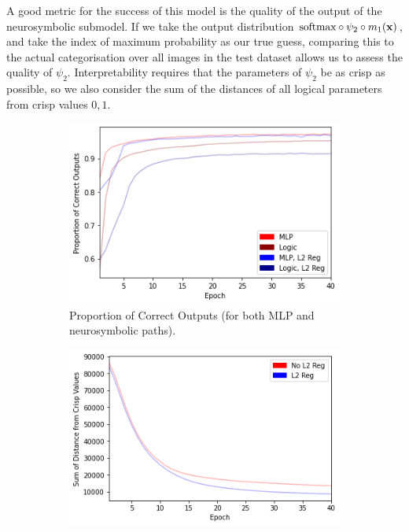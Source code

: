 A good metric for the success of this model is the quality of the output of the neurosymbolic submodel. If we take the output distribution $\text{softmax} \circ \psi_2 \circ m_1 (\mathbf{x})$, and take the index of maximum probability as our true guess, comparing this to the actual categorisation over all images in the test dataset allows us to assess the quality of $\psi_2$. Interpretability requires that the parameters of $\psi_2$ be as crisp as possible, so we also consider the sum of the distances of all logical parameters from crisp values $0, 1$.

\begin{figure}[H]
    \centering
    \begin{subfigure}[t]{0.45\textwidth}
        \centering
        \includegraphics[width=\textwidth]{imgs/mnist-co.png}
        \caption{Proportion of Correct Outputs (for both MLP and neurosymbolic paths).}
        \label{fig:mnistco}
    \end{subfigure}
    \begin{subfigure}[t]{0.45\textwidth}
        \centering
        \includegraphics[width=\textwidth]{imgs/mnist-crispness.png}

\end{subfigure}
\end{figure}
